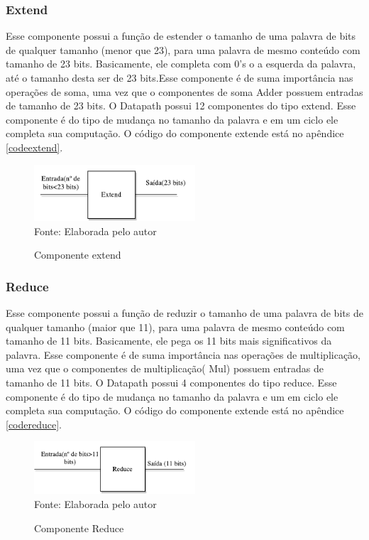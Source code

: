 \subsubsection{Extend}
Esse componente possui a função de estender o tamanho de uma palavra de bits de qualquer tamanho (menor que 23), para uma palavra de mesmo conteúdo com tamanho de 23 bits. Basicamente, ele completa com 0's o a esquerda da palavra, até o tamanho desta ser de 23 bits.Esse componente é de suma importância nas operações de soma, uma vez que o componentes de soma Adder  possuem entradas de tamanho de 23 bits. O Datapath possui 12 componentes do tipo extend. Esse componente é do tipo de mudança no tamanho da palavra e em um ciclo ele completa sua computação. O código do componente extende está no apêndice \ref{codeextend}.


\begin{figure}[H]
	\centering
		\caption{Componente extend}
	\includegraphics[width=6cm]{figures/Extend.pdf}\\

	{Fonte: Elaborada pelo autor}
	\label{extend}
\end{figure}


\subsubsection{Reduce}
Esse componente possui a função de reduzir o tamanho de uma palavra de bits de qualquer tamanho (maior que 11), para uma palavra de mesmo conteúdo com tamanho de 11 bits. Basicamente, ele pega os 11 bits mais significativos da palavra. Esse componente é de suma importância nas operações de multiplicação, uma vez que o componentes de multiplicação( Mul) possuem entradas de tamanho de 11 bits. O Datapath possui 4 componentes do tipo reduce. Esse componente é do tipo de mudança no tamanho da palavra e um em ciclo ele completa sua computação. O código do componente extende está no apêndice \ref{codereduce}.


\begin{figure}[H]
	\centering
		\caption{Componente Reduce}
	\includegraphics[width=6cm]{figures/Reduce.pdf}\\

		{Fonte: Elaborada pelo autor}
	\label{reduce}
\end{figure}


